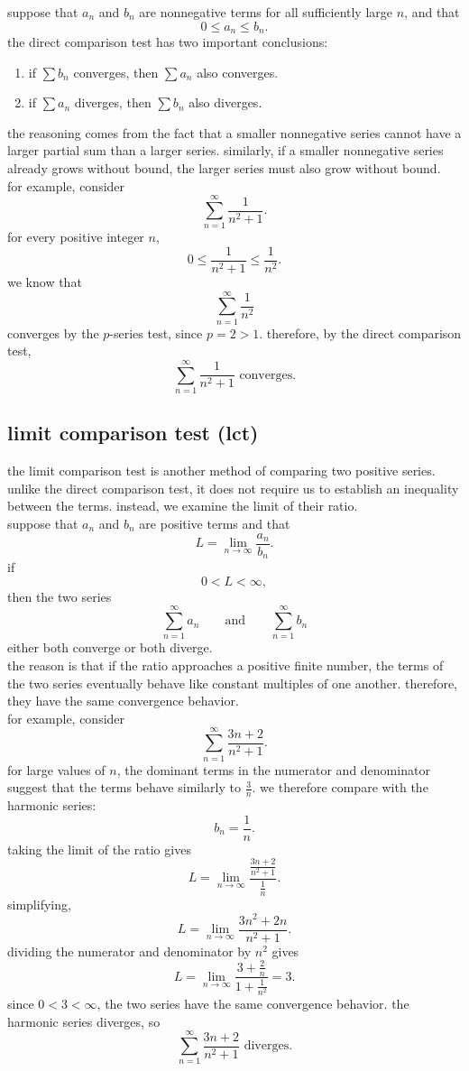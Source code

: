 \documentclass{article}
\begin{document}
suppose that $a_n$ and $b_n$ are nonnegative terms for all sufficiently large $n$, and that
\[
0\leq a_n\leq b_n.
\]
the direct comparison test has two important conclusions:

\begin{enumerate}
    \item if $\sum b_n$ converges, then $\sum a_n$ also converges.
    \item if $\sum a_n$ diverges, then $\sum b_n$ also diverges.
\end{enumerate}

the reasoning comes from the fact that a smaller nonnegative series cannot have a larger partial sum than a larger series. similarly, if a smaller nonnegative series already grows without bound, the larger series must also grow without bound.\\

for example, consider
\[
\sum_{n=1}^{\infty}\frac{1}{n^2+1}.
\]
for every positive integer $n$,
\[
0\leq\frac{1}{n^2+1}\leq\frac{1}{n^2}.
\]
we know that
\[
\sum_{n=1}^{\infty}\frac{1}{n^2}
\]
converges by the $p$-series test, since $p=2>1$. therefore, by the direct comparison test,
\[
\boxed{
\sum_{n=1}^{\infty}\frac{1}{n^2+1}
\text{ converges.}
}
\]

\subsection{limit comparison test (lct)}

the limit comparison test is another method of comparing two positive series. unlike the direct comparison test, it does not require us to establish an inequality between the terms. instead, we examine the limit of their ratio.\\

suppose that $a_n$ and $b_n$ are positive terms and that
\[
L=\lim_{n\to\infty}\frac{a_n}{b_n}.
\]
if
\[
0<L<\infty,
\]
then the two series
\[
\sum_{n=1}^{\infty}a_n
\qquad\text{and}\qquad
\sum_{n=1}^{\infty}b_n
\]
either both converge or both diverge.\\

the reason is that if the ratio approaches a positive finite number, the terms of the two series eventually behave like constant multiples of one another. therefore, they have the same convergence behavior.\\

for example, consider
\[
\sum_{n=1}^{\infty}\frac{3n+2}{n^2+1}.
\]
for large values of $n$, the dominant terms in the numerator and denominator suggest that the terms behave similarly to $\frac{3}{n}$. we therefore compare with the harmonic series:
\[
b_n=\frac{1}{n}.
\]
taking the limit of the ratio gives
\[
L=
\lim_{n\to\infty}
\frac{\frac{3n+2}{n^2+1}}{\frac{1}{n}}.
\]
simplifying,
\[
L=
\lim_{n\to\infty}
\frac{3n^2+2n}{n^2+1}.
\]
dividing the numerator and denominator by $n^2$ gives
\[
L=
\lim_{n\to\infty}
\frac{3+\frac{2}{n}}{1+\frac{1}{n^2}}
=3.
\]
since $0<3<\infty$, the two series have the same convergence behavior. the harmonic series diverges, so
\[
\boxed{
\sum_{n=1}^{\infty}\frac{3n+2}{n^2+1}
\text{ diverges.}
}
\]
\end{document}
